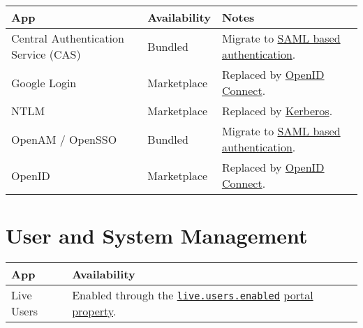 \noindent\hrulefill

\begin{longtable}[]{@{}
  >{\raggedright\arraybackslash}p{}
  >{\raggedright\arraybackslash}p{}
  >{\raggedright\arraybackslash}p{}@{}}
\toprule\noalign{}
\begin{minipage}[b]{\linewidth}\raggedright
App
\end{minipage} & \begin{minipage}[b]{\linewidth}\raggedright
Availability
\end{minipage} & \begin{minipage}[b]{\linewidth}\raggedright
Notes
\end{minipage} \\
\midrule\noalign{}
\endhead
\bottomrule\noalign{}
\endlastfoot
Central Authentication Service (CAS) & Bundled & Migrate to
\href{https://help.liferay.com/hc/en-us/articles/360028711032-Introduction-to-Authenticating-Using-SAML}{SAML
based authentication}. \\
Google Login & Marketplace & Replaced by
\href{/docs/7-2/deploy/-/knowledge_base/d/authenticating-with-openid-connect}{OpenID
Connect}. \\
NTLM & Marketplace & Replaced by
\href{/docs/7-2/deploy/-/knowledge_base/d/authenticating-with-kerberos}{Kerberos}. \\
OpenAM / OpenSSO & Bundled & Migrate to
\href{https://help.liferay.com/hc/en-us/articles/360028711032-Introduction-to-Authenticating-Using-SAML}{SAML
based authentication}. \\
OpenID & Marketplace & Replaced by
\href{/docs/7-2/deploy/-/knowledge_base/d/authenticating-with-openid-connect}{OpenID
Connect}. \\
\end{longtable}

\noindent\hrulefill

\section{User and System Management}\label{user-and-system-management}

\noindent\hrulefill

\begin{longtable}[]{@{}
  >{\raggedright\arraybackslash}p{}
  >{\raggedright\arraybackslash}p{}@{}}
\toprule\noalign{}
\begin{minipage}[b]{\linewidth}\raggedright
App
\end{minipage} & \begin{minipage}[b]{\linewidth}\raggedright
Availability
\end{minipage} \\
\midrule\noalign{}
\endhead
\bottomrule\noalign{}
\endlastfoot
Live Users & Enabled through the
\href{@platform-ref@/7.2-latest/propertiesdoc/portal.properties.html}{\texttt{live.users.enabled}}
\href{/docs/7-2/deploy/-/knowledge_base/d/portal-properties}{portal
property}. \\
\end{longtable}

